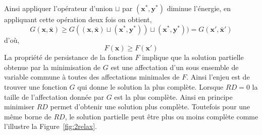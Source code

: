 \documentclass[../main/These_Mathias_Paget.tex]{subfiles}
\begin{document}
	Ainsi appliquer l'opérateur d'union $\sqcup$ par $(\boldsymbol{x^*},\boldsymbol{y^*})$ diminue l’énergie, en appliquant cette opération deux fois on obtient,
	\begin{equation}
	G(\boldsymbol{x},\boldsymbol{\bar{x}}) \geq G( (\boldsymbol{x},\boldsymbol{\bar{x}}) \sqcup (\boldsymbol{x^*},\boldsymbol{y^*})) \sqcup (\boldsymbol{x^*},\boldsymbol{y^*})) = G(\boldsymbol{x'},\boldsymbol{\bar{x}'})
	\end{equation}
	d'où,
	\begin{equation}
	 	F(\boldsymbol{x}) \geq F(\boldsymbol{x'})
	\end{equation}
	La propriété de persistance de la fonction $F$ implique que la solution partielle obtenue par la minimisation de $G$ est une affectation d'un sous ensemble de variable commune à toutes des affectations minimales de $F$. Ainsi l'enjeu est de trouver une fonction $G$ qui donne le solution la plus complète. Lorsque $RD=0$ la taille de l'affectation donnée par $G$ est la plus complète. Ainsi en principe minimiser $RD$ permet d'obtenir une solution plus complète. Toutefois pour une même borne de $RD$, le solution partielle peut être plus ou moins complète comme l'illustre la Figure~\ref{fig:2relax}.
\end{document}
